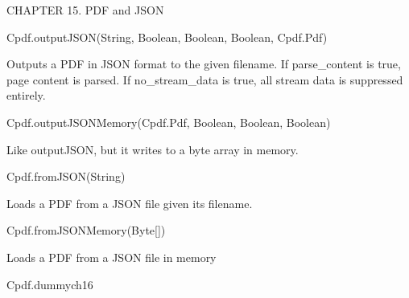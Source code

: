 CHAPTER 15. PDF and JSON

Cpdf.outputJSON(String, Boolean, Boolean, Boolean, Cpdf.Pdf)

Outputs a PDF
in JSON format to the given filename. If parse_content is true, page content
is parsed. If no_stream_data is true, all stream data is suppressed entirely.

Cpdf.outputJSONMemory(Cpdf.Pdf, Boolean, Boolean, Boolean)

Like
outputJSON, but it writes to a byte array in memory.

Cpdf.fromJSON(String)

Loads a PDF from a JSON file given its filename.

Cpdf.fromJSONMemory(Byte[])

Loads a PDF from a JSON file in memory

Cpdf.dummych16

